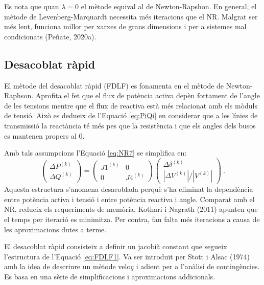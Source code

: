 Es nota que quan $\lambda=0$ el mètode equival al de Newton-Rapshon. En general, el mètode de Levenberg-Marquardt necessita més iteracions que el NR. Malgrat ser més lent, funciona millor per xarxes de grans dimensions i per a sistemes mal condicionats (Peñate, 2020a).


\subsection{Desacoblat ràpid} %
El mètode del desacoblat ràpid (FDLF) es fonamenta en el mètode de Newton-Raphson. Aprofita el fet que el flux de potència activa depèn fortament de l'angle de les tensions mentre que el flux de reactiva està més relacionat amb els mòduls de tensió. Això es dedueix de l'Equació \ref{eq:PiQi} en considerar que a les línies de transmissió la reactància té més pes que la resistència i que els angles dels busos es mantenen propers al 0. 

Amb tals assumpcions l'Equació \ref{eq:NR7} se simplifica en: 
\begin{equation}
    \begin{pmatrix}
        \Delta P^{(k)}\\
        \Delta Q^{(k)}
    \end{pmatrix}
    = \begin{pmatrix}
        J1^{(k)} & 0\\
        0 & J4^{(k)}
    \end{pmatrix}
    \begin{pmatrix}
        \Delta \delta^{(k)}\\
        |\Delta V^{(k)}|/|V^{(k)}|
    \end{pmatrix}\ .
\label{eq:FDLF1}
\end{equation}
Aquesta estructura s'anomena desacoblada perquè s'ha eliminat la dependència entre potència activa i tensió i entre potència reactiva i angle. Comparat amb el NR, redueix els requeriments de memòria. Kothari i Nagrath (2011) apunten que el temps per iteració es minimitza. Per contra, fan falta més iteracions a causa de les aproximacions dutes a terme. 

El desacoblat ràpid consisteix a definir un jacobià constant que segueix l'estructura de l'Equació \ref{eq:FDLF1}. Va ser introduït per Stott i Alsac (1974) amb la idea de descriure un mètode veloç i adient per a l'anàlisi de contingències. Es basa en una sèrie de simplificacions i aproximacions addicionals.

